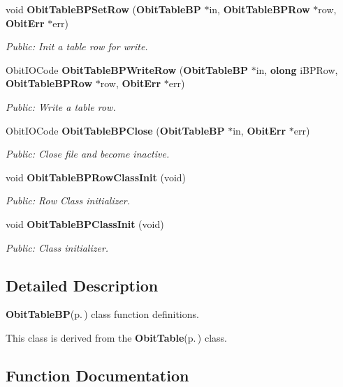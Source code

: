 \begin{CompactItemize}
void {\bf Obit\-Table\-BPSet\-Row} ({\bf Obit\-Table\-BP} $\ast$in, {\bf Obit\-Table\-BPRow} $\ast$row, {\bf Obit\-Err} $\ast$err)
\begin{CompactList}\small\item\em Public: Init a table row for write. \item\end{CompactList}\item 
Obit\-IOCode {\bf Obit\-Table\-BPWrite\-Row} ({\bf Obit\-Table\-BP} $\ast$in, {\bf olong} i\-BPRow, {\bf Obit\-Table\-BPRow} $\ast$row, {\bf Obit\-Err} $\ast$err)
\begin{CompactList}\small\item\em Public: Write a table row. \item\end{CompactList}\item 
Obit\-IOCode {\bf Obit\-Table\-BPClose} ({\bf Obit\-Table\-BP} $\ast$in, {\bf Obit\-Err} $\ast$err)
\begin{CompactList}\small\item\em Public: Close file and become inactive. \item\end{CompactList}\item 
void {\bf Obit\-Table\-BPRow\-Class\-Init} (void)
\begin{CompactList}\small\item\em Public: Row Class initializer. \item\end{CompactList}\item 
void {\bf Obit\-Table\-BPClass\-Init} (void)
\begin{CompactList}\small\item\em Public: Class initializer. \item\end{CompactList}\end{CompactItemize}


\subsection{Detailed Description}
{\bf Obit\-Table\-BP}{\rm (p.\,\pageref{structObitTableBP})} class function definitions. 

This class is derived from the {\bf Obit\-Table}{\rm (p.\,\pageref{structObitTable})} class.

\subsection{Function Documentation}
